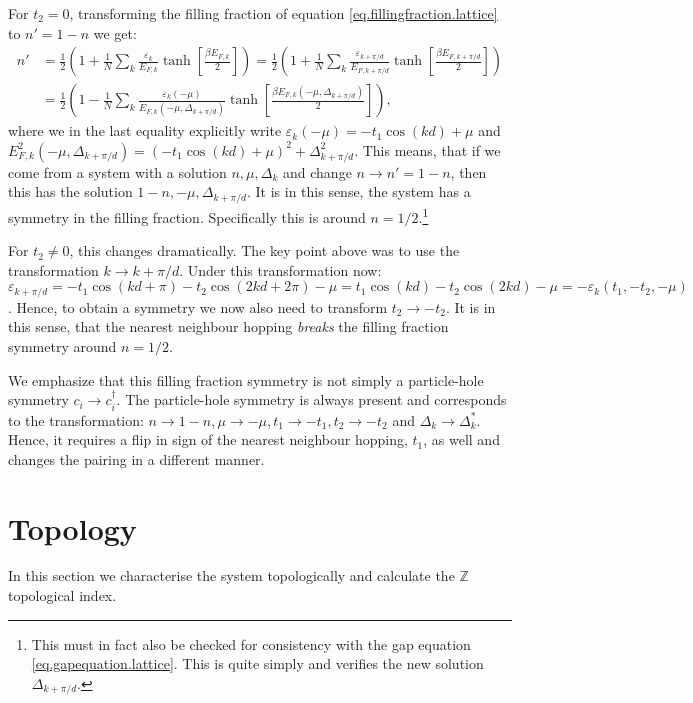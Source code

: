 For $t_2 = 0$, transforming the filling fraction of equation \eqref{eq.fillingfraction.lattice} to $n' = 1 - n$ we get:
\begin{align}
n' 	&= \frac{1}{2}\left(1 + \frac{1}{N}\sum_k \frac{\varepsilon_k}{E_{F,k}}\tanh\left[\frac{\beta E_{F,k}}{2} \right] \right) = \frac{1}{2}\left(1 + \frac{1}{N}\sum_k \frac{\varepsilon_{k + \pi/d}}{E_{F,k + \pi/d}}\tanh\left[\frac{\beta E_{F,k + \pi/d}}{2} \right] \right) \nonumber \\ 
	&= \frac{1}{2}\left(1 - \frac{1}{N}\sum_k \frac{\varepsilon_{k}(-\mu)}{E_{F,k}(-\mu, \Delta_{k + \pi/d})}\tanh\left[\frac{\beta E_{F,k}(-\mu, \Delta_{k + \pi/d})}{2} \right] \right), \nonumber
\end{align}
where we in the last equality explicitly write $\varepsilon_{k}(-\mu) = -t_1\cos(kd) + \mu$ and $E^2_{F,k}(-\mu, \Delta_{k + \pi/d}) = (-t_1\cos(kd)+\mu)^2 + \Delta^2_{k+\pi/d}$. This means, that if we come from a system with a solution $n, \mu, \Delta_k$ and change $n \to n' = 1 - n$, then this has the solution $1 - n, -\mu, \Delta_{k+\pi/d}$. It is in this sense, the system has a symmetry in the filling fraction. Specifically this is around $n = 1/2$.\footnote{This must in fact also be checked for consistency with the gap equation \eqref{eq.gapequation.lattice}. This is quite simply and verifies the new solution $\Delta_{k + \pi/d}$. } 

For $t_2 \neq 0$, this changes dramatically. The key point above was to use the transformation $k\to k + \pi/d$. Under this transformation now: $\varepsilon_{k + \pi/d} = -t_1\cos(kd + \pi) - t_2\cos(2kd + 2\pi) - \mu = t_1\cos(kd) - t_2\cos(2kd) - \mu = -\varepsilon_k(t_1,-t_2,-\mu)$. Hence, to obtain a symmetry we now also need to transform $t_2 \to -t_2$. It is in this sense, that the nearest neighbour hopping \textit{breaks} the filling fraction symmetry around $n = 1/2$. 

We emphasize that this filling fraction symmetry is not simply a particle-hole symmetry $c_i \to c^\dagger_i$. The particle-hole symmetry is always present and corresponds to the transformation: $n \to 1 - n, \mu \to -\mu, t_1 \to -t_1, t_2 \to -t_2$ and  $\Delta_k \to \Delta_k^*$. Hence, it requires a flip in sign of the nearest neighbour hopping, $t_1$, as well and changes the pairing in a different manner.  

\section{Topology} \label{sec.topology.lattice}
In this section we characterise the system topologically and calculate the $\mathbb{Z}$ topological index. 

